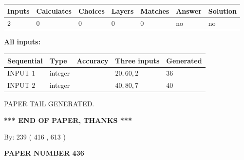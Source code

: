 \documentclass[12pt]{article}
\begin{document}
   
   
   
\noindent\begin{tabular}{|l|l|l|l|l|l|l|}
 \hline
Inputs & Calculates & Choices & Layers & Matches & Answer & Solution \\ \hline
 2  & 
 0  & 
 0
  & 
 0  & 
 0  & 
  no & 
  no 
  \\ \hline
 \end{tabular}
   
   
   
   
\noindent{}
   
   
   
   
\noindent\vspace{0.1in}\hspace{-0.08in} {\textbf{\Large{All inputs: }}}
   
   
  
  
\noindent\begin{tabular}{|l|l|l|l|l|}
\hline
 Sequential & Type & Accuracy & Three inputs & Generated \\ 
\hline
 
 
  INPUT $  1 $ & integer &  & $
 20
 , 
 60
 , 
 2
 $ & $ 36 $ 
 \\  \hline  
 
 
  INPUT $  2 $ & integer &  & $
 40
 , 
 80
 , 
 7
 $ & $ 40 $ 
 \\  \hline  
 \end{tabular}
   
   
   
   
   
   
 \vspace{0.2in}
 
   
   
\vspace{2.0in} PAPER TAIL GENERATED.
   
   
   
   
\vspace{1.0in} 
{\textbf{\large{ *** END OF PAPER, THANKS *** }}} 
   
   
\hspace{1.0in} By: 
 239 ( 416 ,  613 )
   
   
   
   
\newpage 
\setcounter{page}{ 
   436001 } 
   
   
   
   
 {\textbf{ \Large{ PAPER NUMBER  436  }}}
   
\end{document}
